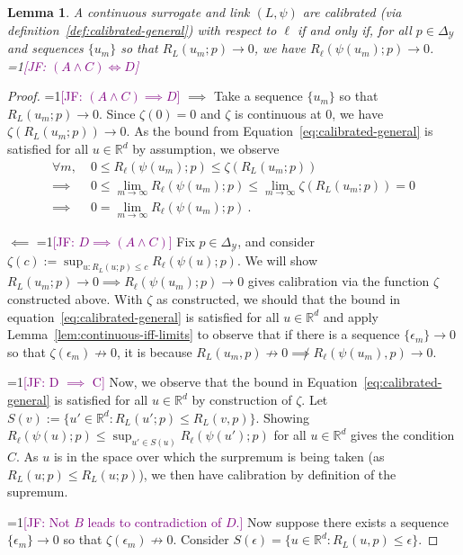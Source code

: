 \documentclass{article}
\newcommand{\Comments}{1}
\newcommand{\mynote}[2]{\ifnum\Comments=1\textcolor{#1}{#2}\fi}
\newcommand{\jessie}[1]{\mynote{purple}{[JF: #1]}}
\newcommand{\reals}{\mathbb{R}}
\newcommand{\simplex}{\Delta_\Y}
\newcommand{\Y}{\mathcal{Y}}
\newtheorem{lemma}{Lemma}
\begin{document}
\begin{lemma}\label{lem:calib-converging-regrets}
	A continuous surrogate and link $(L,\psi)$ are calibrated (via definition~\ref{def:calibrated-general}) with respect to $\ell$ if and only if, for all $p \in \simplex$ and sequences $\{u_m\}$ so that $R_L(u_m; p) \to 0$, we have $R_\ell(\psi(u_m); p) \to 0$.
	\jessie{$(A \wedge C) \iff D$}
\end{lemma}
\begin{proof}
\jessie{$(A \wedge C) \implies D$}
	$\implies$ Take a sequence $\{u_m\}$ so that $R_L(u_m;p) \to 0$.
	Since $\zeta(0) = 0$ and $\zeta$ is continuous at $0$, we have $\zeta(R_L(u_m;p)) \to 0$.
	As the bound from Equation~\eqref{eq:calibrated-general} is satisfied for all $u \in \reals^d$ by assumption, we observe
	\begin{align*}
	\forall m, \; &0 \leq R_\ell(\psi(u_m); p) \leq \zeta(R_L(u_m;p))\\
	\implies &0 \leq \lim_{m \to \infty} R_\ell(\psi(u_m); p) \leq \lim_{m \to \infty} \zeta(R_L(u_m;p)) = 0\\
	\implies &0 = \lim_{m\to\infty} R_\ell(\psi(u_m); p) ~.~
	\end{align*}
	
	
	$\impliedby$ 
\jessie{$D \implies (A \wedge C)$}
	Fix $p \in \simplex$, and consider $\zeta(c) := \sup_{u: R_L(u;p) \leq c} R_\ell(\psi(u); p)$.  
	We will show $R_L(u_m; p) \to 0 \implies R_\ell(\psi(u_m); p) \to 0$ gives calibration via the function $\zeta$ constructed above. 
	With $\zeta$ as constructed, we should that the bound in equation~\eqref{eq:calibrated-general} is satisfied for all $u \in \reals^d$ and apply Lemma~\ref{lem:continuous-iff-limits} to observe that if there is a sequence $\{\epsilon_m\} \to 0$ so that $\zeta(\epsilon_m) \not \to 0$, it is because $R_L(u_m, p) \not \to 0 \not \implies R_\ell(\psi(u_m), p) \to 0$.
	

\jessie{D $\implies$ C}
Now, we observe that the bound in Equation~\eqref{eq:calibrated-general} is satisfied for all $u \in \reals^d$ by construction of $\zeta$.
Let $S(v) := \{u' \in \reals^d : R_L(u';p) \leq R_L(v,p) \}$.
Showing $R_\ell(\psi(u);p) \leq \sup_{u' \in S(u)} R_\ell(\psi(u') ; p)$ for all $u \in \reals^d$ gives the condition $C$.
As $u$ is in the space over which the surpremum is being taken (as $R_L(u;p) \leq R_L(u;p)$), we then have calibration by definition of the supremum.

\jessie{Not $B$ leads to contradiction of $D$.}
Now suppose there exists a sequence $\{\epsilon_m\} \to 0$ so that $\zeta(\epsilon_m) \not \to 0$.
Consider $S(\epsilon) = \{u \in \reals^d : R_L(u,p) \leq \epsilon\}$.


\end{proof}
\end{document}
